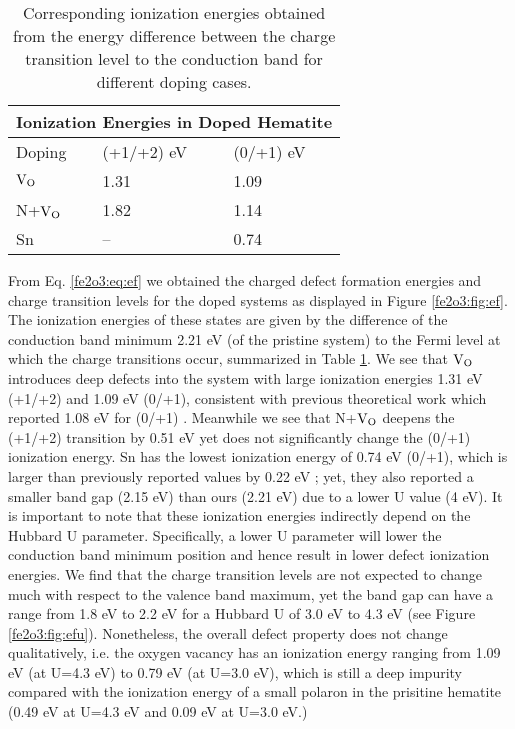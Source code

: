 \begin{table}[t!]
\begin{center}
\begin{tabular}{p{2.5cm}p{2.5cm}p{2.5cm}}
 \hline
 \multicolumn{3}{c}{ Ionization Energies in Doped Hematite \vspace{0.5mm}} \\
 \hline
 Doping & (+1/+2) eV & (0/+1) eV\\
 \hline
 $\text{V}_\text{O}$ & 1.31  & 1.09 \\
 N+$\text{V}_\text{O}$& 1.82 & 1.14 \\
 Sn & -- & 0.74 \\
 \hline
\end{tabular}
\end{center}
\caption{Corresponding ionization energies obtained from the energy difference between the charge transition level to the conduction band for different doping cases.} \label{fe2o3:table:ef}
\end{table}




From Eq. \ref{fe2o3:eq:ef} we obtained the charged defect formation energies and charge transition levels for the doped systems as displayed in Figure \ref{fe2o3:fig:ef}. The ionization energies of these states are given by the difference of the conduction band minimum 2.21 eV (of the pristine system) to the Fermi level at which the charge transitions occur, summarized in Table \ref{fe2o3:table:ef}. We see that $\text{V}_\text{O}$ introduces deep defects into the system with large ionization energies 1.31 eV (+1/+2) and 1.09 eV (0/+1), consistent with previous theoretical work which reported 1.08 eV for (0/+1) \cite{lee2013thermodynamics}. Meanwhile we see that N+$\text{V}_\text{O}$ deepens the (+1/+2) transition by 0.51 eV yet does not significantly change the (0/+1) ionization energy. Sn has the lowest ionization energy of 0.74 eV (0/+1), which is larger than previously reported values by 0.22 eV \cite{zhou2015understanding}; yet, they also reported a smaller band gap (2.15 eV) than ours (2.21 eV) due to a lower U value (4 eV). It is important to note that these ionization energies indirectly depend on the Hubbard U parameter. Specifically, a lower U parameter will lower the conduction band minimum position and hence result in lower defect ionization energies. We find that the charge transition levels are not expected to change much with respect to the valence band maximum, yet the band gap can have a range from 1.8 eV to 2.2 eV for a Hubbard U of 3.0 eV to 4.3 eV (see Figure \ref{fe2o3:fig:efu}). Nonetheless, the overall defect property does not change qualitatively, i.e. the oxygen vacancy has an ionization energy ranging from 1.09 eV (at U=4.3 eV) to 0.79 eV (at U=3.0 eV), which is still a deep impurity compared with the ionization energy of a small polaron in the prisitine hematite (0.49 eV at U=4.3 eV and 0.09 eV at U=3.0 eV.)

